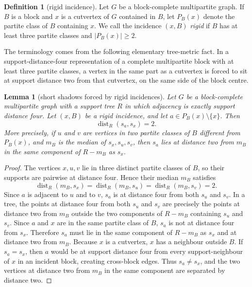 \documentclass[11pt]{article}
\newtheorem{lemma}[theorem]{Lemma}
\theoremstyle{definition}
\newtheorem{definition}[theorem]{Definition}
\newcommand{\dist}{\operatorname{dist}}
\begin{document}
\begin{definition}[rigid incidence]
Let $G$ be a block-complete multipartite graph.  If $B$ is a block and $x$ is a cutvertex of $G$ contained in $B$, let $P_B(x)$ denote the partite class of $B$ containing $x$.  We call the incidence $(x,B)$ \emph{rigid} if $B$ has at least three partite classes and $|P_B(x)|\ge2$.
\end{definition}

The terminology comes from the following elementary tree-metric fact.  In a support-distance-four representation of a complete multipartite block with at least three partite classes, a vertex in the same part as a cutvertex is forced to sit at support distance two from that cutvertex, on the same side of the block centre.

\begin{lemma}[short shadows forced by rigid incidences]\label{lem:k6-rigid-shadow}
Let $G$ be a block-complete multipartite graph with a support tree $R$ in which adjacency is exactly support distance four.  Let $(x,B)$ be a rigid incidence, and let $a\in P_B(x)\setminus\{x\}$.  Then
\[
 \dist_R(s_a,s_x)=2.
\]
More precisely, if $u$ and $v$ are vertices in two partite classes of $B$ different from $P_B(x)$, and $m_B$ is the median of $s_x,s_u,s_v$, then $s_a$ lies at distance two from $m_B$ in the same component of $R-m_B$ as $s_x$.
\end{lemma}

\begin{proof}
The vertices $x,u,v$ lie in three distinct partite classes of $B$, so their supports are pairwise at distance four.  Hence their median $m_B$ satisfies
\[
 \dist_R(m_B,s_x)=\dist_R(m_B,s_u)=\dist_R(m_B,s_v)=2.
\]
Since $a$ is adjacent to $u$ and to $v$, $s_a$ is at distance four from both $s_u$ and $s_v$.  In a tree, the points at distance four from both $s_u$ and $s_v$ are precisely the points at distance two from $m_B$ outside the two components of $R-m_B$ containing $s_u$ and $s_v$.  Since $a$ and $x$ are in the same partite class of $B$, $s_a$ is not at distance four from $s_x$.  Therefore $s_a$ must lie in the same component of $R-m_B$ as $s_x$ and at distance two from $m_B$.  Because $x$ is a cutvertex, $x$ has a neighbour outside $B$.  If $s_a=s_x$, then $a$ would be at support distance four from every support-neighbour of $x$ in an incident block, creating cross-block edges.  Thus $s_a\ne s_x$, and the two vertices at distance two from $m_B$ in the same component are separated by distance two.
\end{proof}
\end{document}
